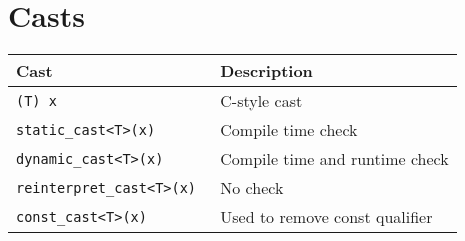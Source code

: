 \chapter{Casts}

\begin{center}
  \begin{tabular}{ll}
    \textbf{Cast} & \textbf{Description} \\
    \toprule
    \tt (T) x & C-style cast \\
    \tt static\_cast<T>(x) & Compile time check \\
    \tt dynamic\_cast<T>(x) & Compile time and runtime check \\
    \tt reinterpret\_cast<T>(x) & No check \\
    \tt const\_cast<T>(x) & Used to remove const qualifier \\
    \bottomrule
  \end{tabular}
\end{center}


